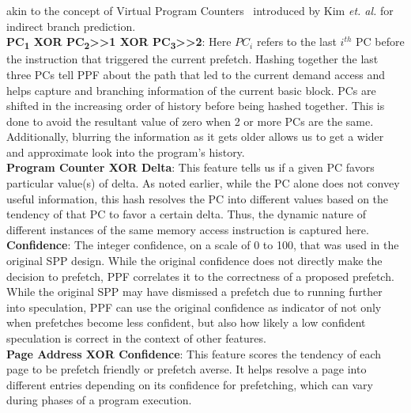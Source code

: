 akin to the concept of Virtual Program Counters~\cite{VPC} introduced by Kim
\textit{et. al.} for indirect branch prediction. \\
%
\textbf{PC\textsubscript{1} XOR PC\textsubscript{2}>>1 XOR
PC\textsubscript{3}>>2}: Here $PC_i$ refers to the last $i^{th}$
PC before the instruction that triggered the current prefetch.
Hashing together the last three PCs tell PPF about the path that led
to the current demand access and helps capture and branching
information of the current basic block. PCs are shifted in the
increasing order of history before being hashed together. This is
done to avoid the resultant value of zero when 2 or more PCs are the
same. Additionally, blurring the information as it gets older
allows us to get a wider and approximate look into the program's
history. \\
%
\textbf{Program Counter XOR Delta}: This feature tells us if a given PC favors
particular value(s) of delta. As noted earlier, while the PC alone does not
convey useful information, this hash resolves the PC into different values
based on the tendency of that PC to favor a certain delta. Thus, the dynamic
nature of different instances of the same memory access instruction is
captured here. \\
%
%
\textbf{Confidence}: The integer confidence, on a scale of 0 to 100, that was
used in the original SPP design. While the original confidence does not
directly make the decision to prefetch, PPF correlates it to the correctness
of a proposed prefetch. While the original SPP may have dismissed a prefetch
due to running further into speculation, PPF can use the original confidence
as indicator of not only when prefetches become less confident, but also how
likely a low confident speculation is correct in the context of other
features. \\
\textbf{Page Address XOR Confidence}: This feature scores the tendency of each
page to be prefetch friendly or prefetch averse. It helps resolve a page into
different entries depending on its confidence for prefetching, which can vary
during phases of a program execution. \\
